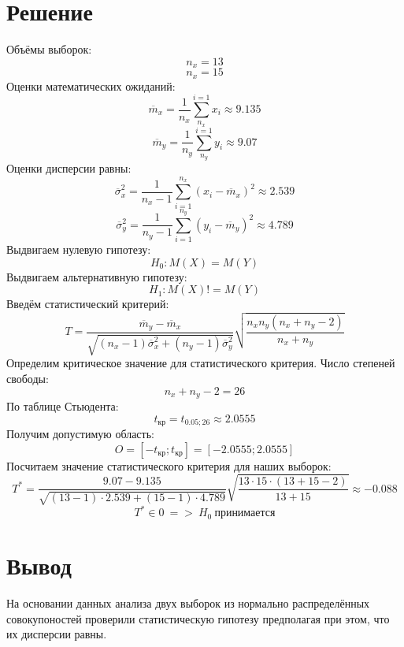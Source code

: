 \documentclass{article}
\begin{document}
\section{Решение}
Объёмы выборок:
\[n_x = 13\]
\[n_x = 15\]
Оценки математических ожиданий:
\[\overline{m}_x = \frac{1}{n_x}\sum_{n_x}^{i=1}x_i \approx 9.135\]
\[\overline{m}_y = \frac{1}{n_y}\sum_{n_y}^{i=1}y_i \approx 9.07\]
Оценки дисперсии равны:
\[\overline{\sigma}_x^2 = \frac{1}{n_x-1}\sum_{i=1}^{n_x}(x_i-\overline{m}_x)^2 \approx 2.539\]
\[\overline{\sigma}_y^2 = \frac{1}{n_y-1}\sum_{i=1}^{n_y}(y_i-\overline{m}_y)^2 \approx 4.789\]
Выдвигаем нулевую гипотезу:
\[H_0: M(X)=M(Y)\]
Выдвигаем альтернативную гипотезу:
\[H_1: M(X)!=M(Y)\]
Введём статистический критерий:
\[T = \frac{\overline{m}_y - \overline{m}_x}{\sqrt{(n_x-1)\overline{\sigma}_x^2 +(n_y-1)\overline{\sigma}_y^2 }}\sqrt{\frac{n_xn_y(n_x+n_y-2)}{n_x+n_y}}\]
Определим критическое значение для статистического критерия. 
Число степеней свободы: 
\[n_x+n_y-2=26\]
По таблице Стьюдента:
\[t_{\text{кр}} = t_{0.05; 26}\approx 2.0555\]
Получим допустимую область:
\[O = [-t_{\text{кр}}; t_{\text{кр}}] = [-2.0555; 2.0555]\]
Посчитаем значение статистического критерия для наших выборок:
\[T^* = \frac{9.07 - 9.135}{\sqrt{(13-1)\cdot 2.539+(15-1)\cdot 4.789}}\sqrt{\frac{13\cdot 15\cdot (13+15-2)}{13+15}}\approx -0.088\]
\[T^*\in 0\ =>\ H_0 \ \text{принимается}\]

\section*{Вывод}
На основании данных анализа двух выборок из нормально распределённых совокупоностей проверили статистическую гипотезу предполагая при этом, что их дисперсии равны.
\end{document}
